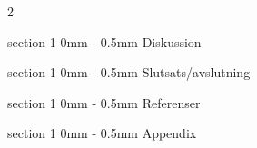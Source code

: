 \documentclass[a4paper]{article}
\makeatletter
\renewcommand{\section}{\@startsection
{section}%
{1}%
{0mm}%
{-\baselineskip}%
{0.5mm}%
{\normalfont\bfseries}} %
\makeatother
\begin{document}
\begin{multicols}{2}

  \section{Diskussion}

  \section{Slutsats/avslutning}

  \section{Referenser}

  \section{Appendix}

\end{multicols}
\end{document}

